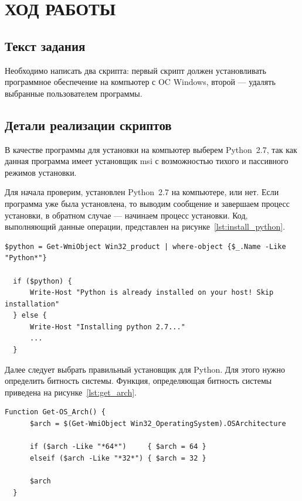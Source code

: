 \section{ХОД РАБОТЫ}

\subsection{Текст задания}

Необходимо написать два скрипта: первый скрипт должен установливать
программное обеспечение на компьютер с OC Windows, второй --- удалять
выбранные пользователем программы.

\subsection{Детали реализации скриптов}

В качестве программы для установки на компьютер выберем Python~2.7,
так как данная программа имеет установщик msi с возможностью
тихого и пассивного режимов установки.

Для начала проверим, установлен Python~2.7 на компьютере, или нет. Если
программа уже была установлена, то выводим сообщение и завершаем процесс
установки, в обратном случае --- начинаем процесс установки. Код, выполняющий
данные операции, представлен на рисунке~\ref{lst:install_python}.

\begin{lstlisting}[caption=Проверка на существование Python 2.7 в системе,
label=lst:install_python,basicstyle=\scriptsize\ttfamily]
  $python = Get-WmiObject Win32_product | where-object {$_.Name -Like "Python*"}

  if ($python) {
      Write-Host "Python is already installed on your host! Skip installation"
  } else {
      Write-Host "Installing python 2.7..."
      ...
  }
\end{lstlisting}

Далее следует выбрать правильный установщик для Python. Для этого нужно
определить битность системы. Функция, определяющая битность системы
приведена на рисунке~\ref{lst:get_arch}.

\begin{lstlisting}[caption=Определение битности системы,
label=lst:get_arch,basicstyle=\scriptsize\ttfamily]
  Function Get-OS_Arch() {
      $arch = $(Get-WmiObject Win32_OperatingSystem).OSArchitecture

      if ($arch -Like "*64*")     { $arch = 64 }
      elseif ($arch -Like "*32*") { $arch = 32 }

      $arch
  }
\end{lstlisting}

